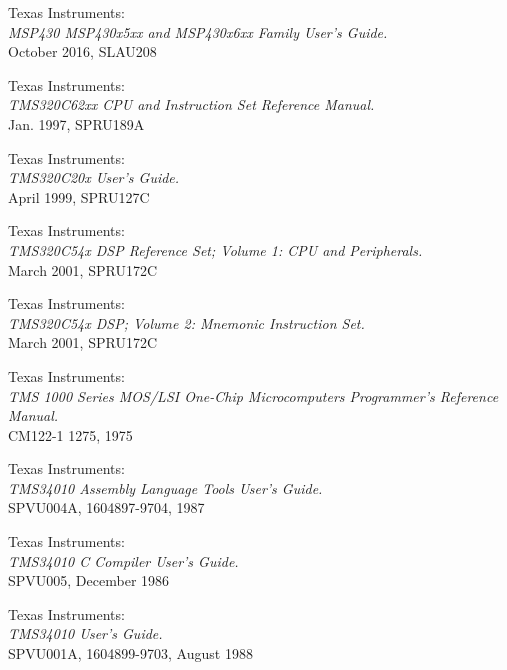  Texas Instruments: \\
                 {\em MSP430 MSP430x5xx and MSP430x6xx Family
                  User's Guide.\/} \\
                 October 2016, SLAU208

 Texas Instruments: \\
                {\em TMS320C62xx CPU and Instruction Set Reference
                 Manual.\/} \\
                Jan. 1997, SPRU189A

 Texas Instruments: \\
                 {\em TMS320C20x User's Guide.\/} \\
                 April 1999, SPRU127C

 Texas Instruments: \\
                     {\em TMS320C54x DSP Reference Set;
                     Volume 1: CPU and Peripherals.\/} \\
                     March 2001, SPRU172C

 Texas Instruments: \\
                     {\em TMS320C54x DSP; Volume 2: Mnemonic Instruction
                     Set.\/} \\
                     March 2001, SPRU172C

 Texas Instruments: \\
                     {\em TMS 1000 Series MOS/LSI One-Chip
                     Microcomputers Programmer's Reference
                     Manual.\/} \\
                     CM122-1 1275, 1975

 Texas Instruments: \\
                     {\em TMS34010 Assembly Language Tools User's Guide.\/} \\
                     SPVU004A, 1604897-9704, 1987

 Texas Instruments: \\
                     {\em TMS34010 C Compiler User's Guide.\/} \\
                     SPVU005, December 1986

 Texas Instruments: \\
                     {\em TMS34010 User's Guide.\/} \\
                     SPVU001A, 1604899-9703, August 1988


